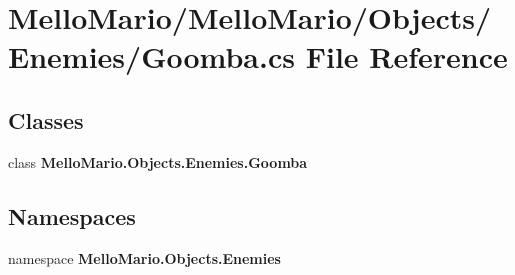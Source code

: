 \section{Mello\+Mario/\+Mello\+Mario/\+Objects/\+Enemies/\+Goomba.cs File Reference}
\label{Goomba_8cs}
\subsection*{Classes}
\begin{DoxyCompactItemize}
\item 
class \textbf{ Mello\+Mario.\+Objects.\+Enemies.\+Goomba}
\end{DoxyCompactItemize}
\subsection*{Namespaces}
\begin{DoxyCompactItemize}
\item 
namespace \textbf{ Mello\+Mario.\+Objects.\+Enemies}
\end{DoxyCompactItemize}
